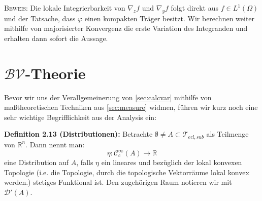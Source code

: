 \textsc{Beweis:} Die lokale Integrierbarkeit von \(\nabla_z f\) und \(\nabla_y f\) folgt direkt aus \(f \in L^1(\Omega)\) und der Tatsache, dass \(\varphi\) einen kompakten Träger besitzt. Wir berechnen weiter mithilfe von majorisierter Konvergenz die erste Variation des Integranden und erhalten dann sofort die Aussage.\QEDB
\section[BV-Theorie]{\(\mathcal{BV}\)-Theorie}{\label{sec:bv}}
Bevor wir uns der Verallgemeinerung von \ref{sec:calcvar} mithilfe von maßtheoretischen Techniken aus \ref{sec:measure} widmen, führen wir kurz noch eine sehr wichtige Begrifflichkeit aus der Analysis ein:\\[0.5cm]
\colorbox{generalYellow}{\begin{minipage}{16cm}{\textcolor{black}{}{\label{def2.13}}}
\textbf{Definition 2.13 (Distributionen):} Betrachte \(\emptyset \neq A \subset \mathcal{T}_{ecl,sub}\) als Teilmenge von \(\mathbb{R}^n\). Dann nennt man:
\begin{equation}
    \eta : \mathcal{C}^{\infty}_c(A) \to \mathbb{R}
\end{equation}
eine Distribution auf \(A\), falls \(\eta\) ein lineares und bezüglich der lokal konvexen Topologie (i.e. die Topologie, durch die topologische Vektorräume lokal konvex werden.) stetiges Funktional ist. Den zugehörigen Raum notieren wir mit \(\mathcal{D}'(A)\).
\end{minipage}}
